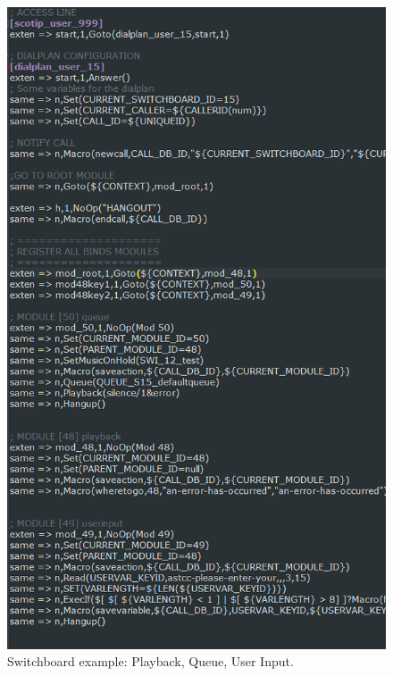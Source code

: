 \begin{figure}[!ht]
  \caption{Switchboard example: Playback, Queue, User Input.}
  \centering
    \includegraphics[width=1\textwidth]{img/exampleDialplan.png}
\end{figure}


